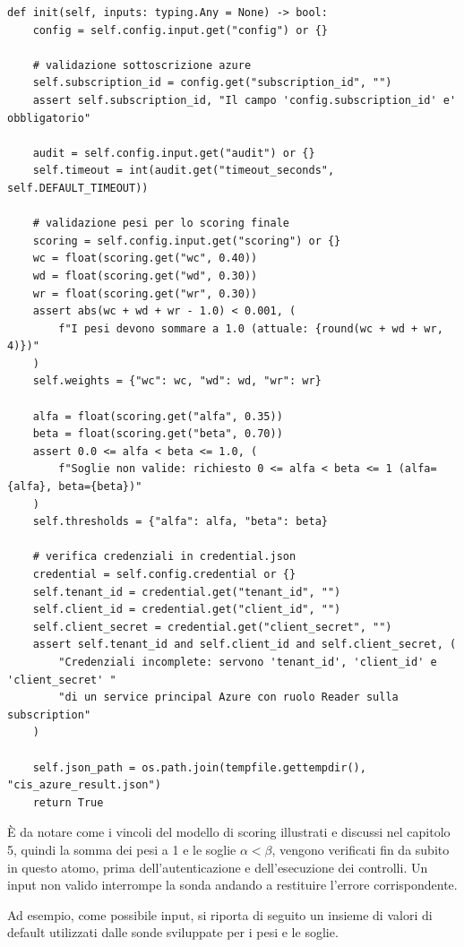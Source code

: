 \documentclass[a4paper,11pt]{report}
\begin{document}
\begin{lstlisting}[style=azcli, caption={Atomo \texttt{init}: validazione dell'input e delle credenziali}, label={lst:init}]
def init(self, inputs: typing.Any = None) -> bool:
    config = self.config.input.get("config") or {}

    # validazione sottoscrizione azure
    self.subscription_id = config.get("subscription_id", "")
    assert self.subscription_id, "Il campo 'config.subscription_id' e' obbligatorio"

    audit = self.config.input.get("audit") or {}
    self.timeout = int(audit.get("timeout_seconds", self.DEFAULT_TIMEOUT))

    # validazione pesi per lo scoring finale
    scoring = self.config.input.get("scoring") or {}
    wc = float(scoring.get("wc", 0.40))
    wd = float(scoring.get("wd", 0.30))
    wr = float(scoring.get("wr", 0.30))
    assert abs(wc + wd + wr - 1.0) < 0.001, (
        f"I pesi devono sommare a 1.0 (attuale: {round(wc + wd + wr, 4)})"
    )
    self.weights = {"wc": wc, "wd": wd, "wr": wr}

    alfa = float(scoring.get("alfa", 0.35))
    beta = float(scoring.get("beta", 0.70))
    assert 0.0 <= alfa < beta <= 1.0, (
        f"Soglie non valide: richiesto 0 <= alfa < beta <= 1 (alfa={alfa}, beta={beta})"
    )
    self.thresholds = {"alfa": alfa, "beta": beta}

    # verifica credenziali in credential.json
    credential = self.config.credential or {}
    self.tenant_id = credential.get("tenant_id", "")
    self.client_id = credential.get("client_id", "")
    self.client_secret = credential.get("client_secret", "")
    assert self.tenant_id and self.client_id and self.client_secret, (
        "Credenziali incomplete: servono 'tenant_id', 'client_id' e 'client_secret' "
        "di un service principal Azure con ruolo Reader sulla subscription"
    )

    self.json_path = os.path.join(tempfile.gettempdir(), "cis_azure_result.json")
    return True
\end{lstlisting}


È da notare come i vincoli del modello di scoring illustrati e discussi nel capitolo 5, quindi la somma dei pesi a 1 e le soglie    $\alpha < \beta$, vengono verificati fin da subito in questo atomo, prima dell'autenticazione e dell'esecuzione dei controlli. Un input non valido interrompe la sonda andando a restituire l'errore corrispondente.

Ad esempio, come possibile input, si riporta di seguito un insieme di valori di default utilizzati dalle sonde sviluppate per i pesi e le soglie.
\end{document}
